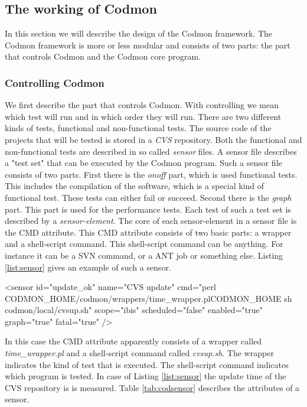 \documentclass{article}
\begin{document}
\subsection{The working of Codmon}
\label{subsec:CodmonDesign}
In this section we will describe the design of the Codmon framework. The Codmon framework is more or less modular and consists of two parts: the part that controls Codmon and the Codmon core program.\\

\subsubsection{Controlling Codmon}
\label{control}
\noindent We first describe the part that controls Codmon. With controlling we mean which test will run and in which order they will run. There are two different kinds of tests, functional and non-functional 
tests. The source code of the projects that will be tested is stored in a \emph{CVS} repository. Both the functional and non-functional tests are described in so called \emph{sensor} files. A sensor file 
describes a "test set" that can be executed by the Codmon program. Such a sensor file consists of two parts. First there is the \emph{onoff} part, which is used functional tests. This includes the compilation 
of the software, which is a special kind of functional test. These tests can either fail or succeed. Second there is the \emph{graph} part. This part is used for the performance tests. Each test of such a test 
set is described by a \emph{sensor-element}. The core of each sensor-element in a sensor file is the CMD attribute. This CMD attribute consists of two basic parts: a wrapper and a shell-script command. 
This shell-script command can be anything. For instance it can be a SVN command, or a ANT job or something else. Listing \ref{list:sensor} gives an example of such a sensor.\\


\begin{code}[frame=shadowbox, language=XML,showstringspaces=false]
 <sensor id="update_ok" 
    name="CVS update" 
    cmd="perl CODMON_HOME/codmon/wrappers/time_wrapper.plCODMON_HOME sh codmon/local/cvsup.sh" 
    scope="ibis" 
    scheduled="false"
    enabled="true"
    graph="true" 
    fatal="true" />
\end{code}

\noindent In this case the CMD attribute apparently consists of a wrapper called \emph{time\_wrapper.pl} and a shell-script command called \emph{cvsup.sh}. The wrapper indicates the kind of test
that is executed. The shell-script command indicates which program is tested. In case of Listing \ref{list:sensor} the update time of the CVS repository is is measured. Table \ref{tab:codsensor} describes
the attributes of a sensor\cite{Codmon}.\\
\end{document}

